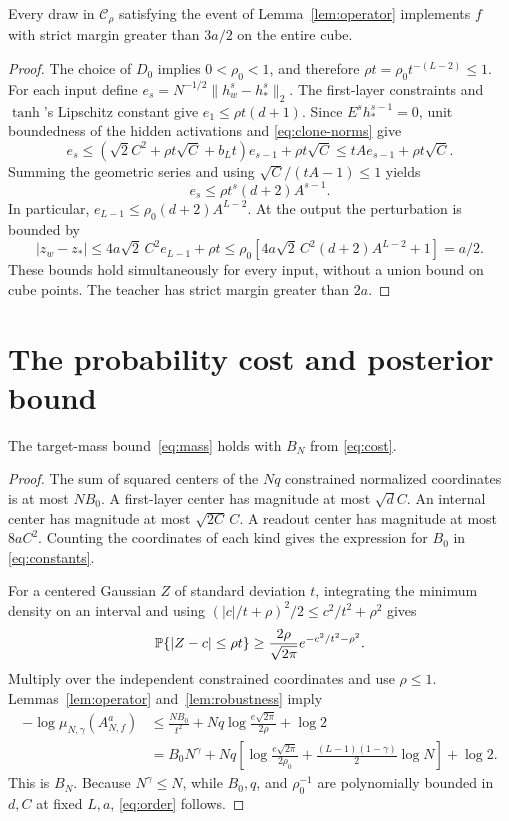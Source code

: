 \documentclass[11pt]{article}
\theoremstyle{remark}\newtheorem{remark}[theorem]{Remark}
\begin{document}
\begin{lemma}\label{lem:robustness}
Every draw in $\mathcal C_\rho$ satisfying the event of
Lemma~\ref{lem:operator} implements $f$ with strict margin greater than
$3a/2$ on the entire cube.
\end{lemma}
\begin{proof}
The choice of $D_0$ implies $0<\rho_0<1$, and therefore
$\rho t=\rho_0t^{-(L-2)}\le1$.
For each input define
$e_s=N^{-1/2}\|h_w^s-h_*^s\|_2$.
The first-layer constraints and $\tanh$'s Lipschitz constant give
$e_1\le\rho t(d+1)$.
Since $E^s h_*^{s-1}=0$, unit boundedness of the hidden activations and
\eqref{eq:clone-norms} give
\[
 e_s\le(\sqrt2 C^2+\rho t\sqrt C+b_Lt)e_{s-1}+\rho t\sqrt C
      \le tA e_{s-1}+\rho t\sqrt C.
\]
Summing the geometric series and using $\sqrt C/(tA-1)\le1$ yields
\[
 e_s\le\rho t^s(d+2)A^{s-1}.
\]
In particular,
$e_{L-1}\le\rho_0(d+2)A^{L-2}$.
At the output the perturbation is bounded by
\[
 |z_w-z_*|\le4a\sqrt2\,C^2e_{L-1}+\rho t
 \le\rho_0[4a\sqrt2\,C^2(d+2)A^{L-2}+1]
 =a/2.
\]
These bounds hold simultaneously for every input, without a union bound
on cube points. The teacher has strict margin greater than $2a$.
\end{proof}

\section{The probability cost and posterior bound}
\begin{lemma}\label{lem:cylinder-cost}
The target-mass bound~\eqref{eq:mass} holds with $B_N$ from
\eqref{eq:cost}.
\end{lemma}
\begin{proof}
The sum of squared centers of the $Nq$ constrained normalized coordinates
is at most $NB_0$. A first-layer center has magnitude at most $\sqrt d C$.
An internal center has magnitude at most $\sqrt{2C}\,C$.
A readout center has magnitude at most $8aC^2$.
Counting the coordinates of each kind gives the expression for $B_0$ in
\eqref{eq:constants}.

For a centered Gaussian $Z$ of standard deviation $t$, integrating the
minimum density on an interval and using
$(|c|/t+\rho)^2/2\le c^2/t^2+\rho^2$ gives
\[
 \mathbb P\{|Z-c|\le\rho t\}
 \ge\frac{2\rho}{\sqrt{2\pi}}e^{-c^2/t^2-\rho^2}.
\]
Multiply over the independent constrained coordinates and use $\rho\le1$.
Lemmas~\ref{lem:operator} and~\ref{lem:robustness} imply
\begin{align*}
 -\log\mu_{N,\gamma}(A_{N,f}^a)
 &\le \frac{NB_0}{t^2}
       +Nq\log\frac{e\sqrt{2\pi}}{2\rho}+\log2\\
 &=B_0N^\gamma
   +Nq\left[\log\frac{e\sqrt{2\pi}}{2\rho_0}
       +\frac{(L-1)(1-\gamma)}2\log N\right]+\log2.
\end{align*}
This is $B_N$. Because $N^\gamma\le N$, while $B_0,q$, and
$\rho_0^{-1}$ are polynomially bounded in $d,C$ at fixed $L,a$,
\eqref{eq:order} follows.
\end{proof}
\end{document}
